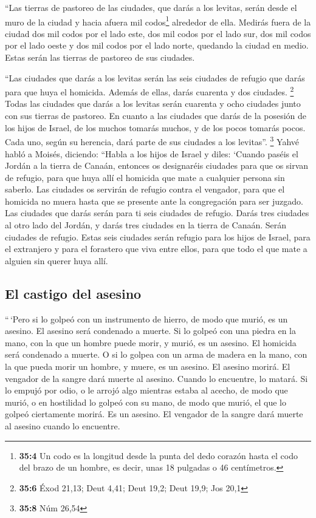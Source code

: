  ``Las tierras de pastoreo de las ciudades, que darás a
los levitas, serán desde el muro de la ciudad y hacia afuera mil
codos\footnote{\textbf{35:4} Un codo es la longitud desde la punta del
  dedo corazón hasta el codo del brazo de un hombre, es decir, unas 18
  pulgadas o 46 centímetros.} alrededor de ella.  Medirás
fuera de la ciudad dos mil codos por el lado este, dos mil codos por el
lado sur, dos mil codos por el lado oeste y dos mil codos por el lado
norte, quedando la ciudad en medio. Estas serán las tierras de pastoreo
de sus ciudades.

 ``Las ciudades que darás a los levitas serán las seis
ciudades de refugio que darás para que huya el homicida. Además de
ellas, darás cuarenta y dos ciudades. \footnote{\textbf{35:6} Éxod
  21,13; Deut 4,41; Deut 19,2; Deut 19,9; Jos 20,1}  Todas
las ciudades que darás a los levitas serán cuarenta y ocho ciudades
junto con sus tierras de pastoreo.  En cuanto a las
ciudades que darás de la posesión de los hijos de Israel, de los muchos
tomarás muchos, y de los pocos tomarás pocos. Cada uno, según su
herencia, dará parte de sus ciudades a los levitas''. \footnote{\textbf{35:8}
  Núm 26,54}  Yahvé habló a Moisés, diciendo:
 ``Habla a los hijos de Israel y diles: `Cuando paséis el
Jordán a la tierra de Canaán,  entonces os designaréis
ciudades para que os sirvan de refugio, para que huya allí el homicida
que mate a cualquier persona sin saberlo.  Las ciudades
os servirán de refugio contra el vengador, para que el homicida no muera
hasta que se presente ante la congregación para ser juzgado.
 Las ciudades que darás serán para ti seis ciudades de
refugio.  Darás tres ciudades al otro lado del Jordán, y
darás tres ciudades en la tierra de Canaán. Serán ciudades de refugio.
 Estas seis ciudades serán refugio para los hijos de
Israel, para el extranjero y para el forastero que viva entre ellos,
para que todo el que mate a alguien sin querer huya allí.

\hypertarget{el-castigo-del-asesino}{%
\subsection{El castigo del asesino}\label{el-castigo-del-asesino}}

 ``\,`Pero si lo golpeó con un instrumento de hierro, de
modo que murió, es un asesino. El asesino será condenado a muerte.
 Si lo golpeó con una piedra en la mano, con la que un
hombre puede morir, y murió, es un asesino. El homicida será condenado a
muerte.  O si lo golpea con un arma de madera en la mano,
con la que pueda morir un hombre, y muere, es un asesino. El asesino
morirá.  El vengador de la sangre dará muerte al asesino.
Cuando lo encuentre, lo matará.  Si lo empujó por odio, o
le arrojó algo mientras estaba al acecho, de modo que murió,
 o en hostilidad lo golpeó con su mano, de modo que
murió, el que lo golpeó ciertamente morirá. Es un asesino. El vengador
de la sangre dará muerte al asesino cuando lo encuentre.


